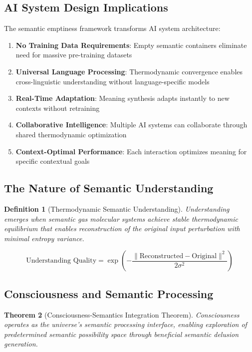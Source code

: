 \documentclass[11pt,a4paper]{article}
\newtheorem{theorem}{Theorem}[section]
\newtheorem{definition}[theorem]{Definition}
\begin{document}
\subsection{AI System Design Implications}

The semantic emptiness framework transforms AI system architecture:

\begin{enumerate}
\item \textbf{No Training Data Requirements}: Empty semantic containers eliminate need for massive pre-training datasets
\item \textbf{Universal Language Processing}: Thermodynamic convergence enables cross-linguistic understanding without language-specific models
\item \textbf{Real-Time Adaptation}: Meaning synthesis adapts instantly to new contexts without retraining
\item \textbf{Collaborative Intelligence}: Multiple AI systems can collaborate through shared thermodynamic optimization
\item \textbf{Context-Optimal Performance}: Each interaction optimizes meaning for specific contextual goals
\end{enumerate}

\subsection{The Nature of Semantic Understanding}

\begin{definition}[Thermodynamic Semantic Understanding]
Understanding emerges when semantic gas molecular systems achieve stable thermodynamic equilibrium that enables reconstruction of the original input perturbation with minimal entropy variance.
\end{definition}

\begin{equation}
\text{Understanding Quality} = \exp\left(-\frac{\|\text{Reconstructed} - \text{Original}\|^2}{2\sigma^2}\right)
\end{equation}

\subsection{Consciousness and Semantic Processing}

\begin{theorem}[Consciousness-Semantics Integration Theorem]
Consciousness operates as the universe's semantic processing interface, enabling exploration of predetermined semantic possibility space through beneficial semantic delusion generation.
\end{theorem}
\end{document}
